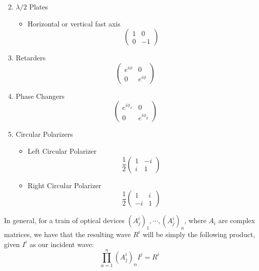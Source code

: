 \documentclass[../electromagnetism.tex]{subfiles}
\begin{document}
\begin{enumerate}
\begin{itemize}
\begin{equation}
			\label{eq:fast45jones}
		\end{equation}
	\end{itemize}
\item $\lambda/2$ Plates
	\begin{itemize}
	\item Horizontal or vertical fast axis
		\begin{equation}
			\begin{pmatrix}
				1&0\\0&-1
			\end{pmatrix}
			\label{eq:lambda2jones}
		\end{equation}
	\end{itemize}
\item Retarders
	\begin{equation}
		\begin{pmatrix}
			e^{i\phi}&0\\0&e^{i\phi}
		\end{pmatrix}
		\label{eq:retarderjones}
	\end{equation}
\item Phase Changers
	\begin{equation}
		\begin{pmatrix}
			e^{i\phi_x}&0\\
			0&e^{i\phi_y}
		\end{pmatrix}
		\label{eq:phasechangerjones}
	\end{equation}
\item Circular Polarizers
	\begin{itemize}
	\item Left Circular Polarizer
		\begin{equation}
			\frac{1}{2}\begin{pmatrix}
				1&-i\\i&1
			\end{pmatrix}
			\label{eq:lcircularpolarjones}
		\end{equation}
	\item Right Circular Polarizer
		\begin{equation}
			\frac{1}{2}\begin{pmatrix}
				1&i\\-i&1
			\end{pmatrix}
			\label{eq:rcircularpoljones}
		\end{equation}
	\end{itemize}
\end{enumerate}
In general, for a train of optical devices $(A^i_j)_1,\cdots,(A^i_j)_n$, where $A_i$ are complex matrices, we have that the resulting wave $R^i$ will be simply the following product, given $I^i$ as our incident wave:
\begin{equation}
	\prod_{\alpha=1}^n(A^i_j)_\alpha I^j=R^i
	\label{eq:multipleoptdevjones}
\end{equation}
\end{document}
